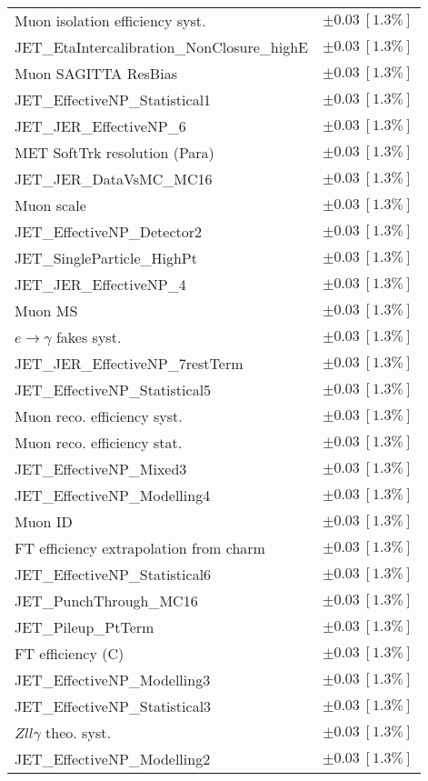 \begin{tabular}{lr}
Muon isolation efficiency syst. & $\pm 0.03\ [1.3\%]$ \\
JET\_EtaIntercalibration\_NonClosure\_highE & $\pm 0.03\ [1.3\%]$ \\
Muon SAGITTA ResBias & $\pm 0.03\ [1.3\%]$ \\
JET\_EffectiveNP\_Statistical1 & $\pm 0.03\ [1.3\%]$ \\
JET\_JER\_EffectiveNP\_6 & $\pm 0.03\ [1.3\%]$ \\
MET SoftTrk resolution (Para) & $\pm 0.03\ [1.3\%]$ \\
JET\_JER\_DataVsMC\_MC16 & $\pm 0.03\ [1.3\%]$ \\
Muon scale & $\pm 0.03\ [1.3\%]$ \\
JET\_EffectiveNP\_Detector2 & $\pm 0.03\ [1.3\%]$ \\
JET\_SingleParticle\_HighPt & $\pm 0.03\ [1.3\%]$ \\
JET\_JER\_EffectiveNP\_4 & $\pm 0.03\ [1.3\%]$ \\
Muon MS & $\pm 0.03\ [1.3\%]$ \\
$e\to\gamma$ fakes syst. & $\pm 0.03\ [1.3\%]$ \\
JET\_JER\_EffectiveNP\_7restTerm & $\pm 0.03\ [1.3\%]$ \\
JET\_EffectiveNP\_Statistical5 & $\pm 0.03\ [1.3\%]$ \\
Muon reco. efficiency syst. & $\pm 0.03\ [1.3\%]$ \\
Muon reco. efficiency stat. & $\pm 0.03\ [1.3\%]$ \\
JET\_EffectiveNP\_Mixed3 & $\pm 0.03\ [1.3\%]$ \\
JET\_EffectiveNP\_Modelling4 & $\pm 0.03\ [1.3\%]$ \\
Muon ID & $\pm 0.03\ [1.3\%]$ \\
FT efficiency extrapolation from charm & $\pm 0.03\ [1.3\%]$ \\
JET\_EffectiveNP\_Statistical6 & $\pm 0.03\ [1.3\%]$ \\
JET\_PunchThrough\_MC16 & $\pm 0.03\ [1.3\%]$ \\
JET\_Pileup\_PtTerm & $\pm 0.03\ [1.3\%]$ \\
FT efficiency (C) & $\pm 0.03\ [1.3\%]$ \\
JET\_EffectiveNP\_Modelling3 & $\pm 0.03\ [1.3\%]$ \\
JET\_EffectiveNP\_Statistical3 & $\pm 0.03\ [1.3\%]$ \\
$Zll\gamma$ theo. syst. & $\pm 0.03\ [1.3\%]$ \\
JET\_EffectiveNP\_Modelling2 & $\pm 0.03\ [1.3\%]$ \\

\end{tabular}
